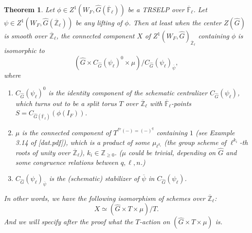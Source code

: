 \documentclass{article}
\newcommand{\red}[1]{\textcolor{red}{#1}}
\newcommand{\blue}[1]{\textcolor{blue}{#1}}
\newtheorem{theorem}{Theorem}
\begin{document}
	\begin{theorem}\label{Theorem: X}
		Let $\phi \in Z^1(W_F, \hat{G}(\overline{\mathbb{F}}_{\ell}))$ be a TRSELP over $\overline{\mathbb{F}}_{\ell}$. Let $\psi \in Z^1(W_F, \hat{G}(\overline{\mathbb{Z}}_{\ell}))$ be any lifting of $\phi$. Then at least when the center $Z(\hat{G})$ is smooth over $\overline{\mathbb{Z}}_{\ell}$, the connected component $X$ of $Z^1(W_F, \hat{G})_{\overline{\mathbb{Z}}_{\ell}}$ containing $\phi$ is isomorphic to $$(\hat{G} \times C_{\hat{G}}(\psi_{\ell})^0 \times \mu)/C_{\hat{G}}(\psi_{\ell})_{\overline{\psi}},$$ where \begin{enumerate}
			\item $C_{\hat{G}}(\psi_{\ell})^0$ is the identity component of the schematic centralizer $C_{\hat{G}}(\psi_{\ell})$, which turns out to be a split torus $T$ over $\overline{\mathbb{Z}}_{\ell}$ with $\overline{\mathbb{F}}_{\ell}$-points $S=C_{\hat{G}(\overline{\mathbb{F}}_{\ell})}(\phi(I_F))$.
			\item $\mu$ is the connected component of $T^{^{Fr}(-)=(-)^q}$ containing $1$ (see Example 3.14 of [dat.pdf]), which is a product of some $\mu_{\ell^{k_i}}$ (the group scheme of ${\ell^{k_i}}$-th roots of unity over $\overline{\mathbb{Z}}_{\ell}$), $k_i \in \mathbb{Z}_{\geq 0}$. ($\mu$ could be trivial, depending on $\hat{G}$ and some congruence relations between $q, \ell, n$.)
			\item $C_{\hat{G}}(\psi_{\ell})_{\overline{\psi}}$ is the (schematic) stabilizer %
			of $\overline{\psi}$ in $C_{\hat{G}}(\psi_{\ell})$.
		\end{enumerate}  
		
		In other words, we have the following isomorphism of schemes over $\overline{\mathbb{Z}}_{\ell}$:
		$$X \simeq (\hat{G} \times T \times \mu)/T.$$ And we will specify after the proof what the $T$-action on $(\hat{G} \times T \times \mu)$ is.
	\end{theorem}
	
\end{document}
